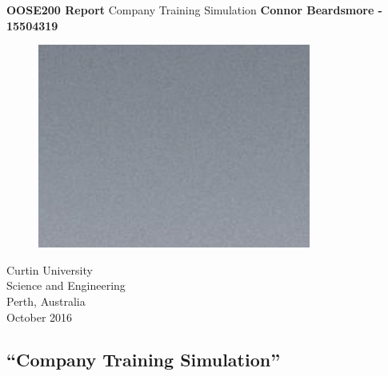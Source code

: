 \documentclass[]{article}
\begin{document}

\begin{titlepage}
	\begin{center}
		\vspace*{1cm}
		\LARGE\textbf{OOSE200 Report}
		\break
		Company Training Simulation
		\vspace{1cm}
		\break
		\Large\textbf{Connor Beardsmore - 15504319} 

		\vspace{3cm}
		\begin{figure}[H]
			\begin{center}
				{ 
					\includegraphics[height=0.3\textheight,width=0.8\textwidth]{placeholder.png}}
			\end{center}
		\end{figure}

		\vspace{4cm}
		\normalsize
		Curtin University \\
		Science and Engineering \\
		Perth, Australia \\
	    October 2016
	    
	\end{center}
\end{titlepage}


\vspace*{-0.8cm}
\begin{center}
	\section*{\textquotedblleft Company Training Simulation\textquotedblright}
\end{center}
\end{document}
